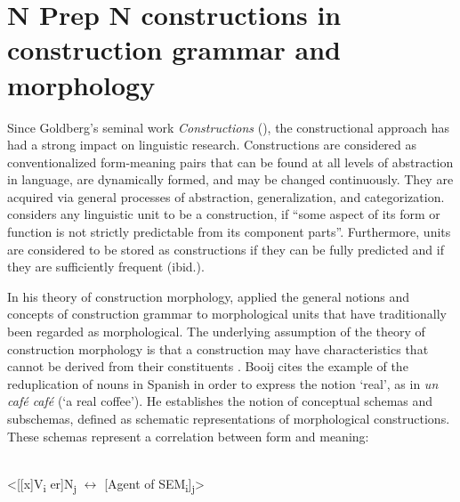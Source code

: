 \documentclass[output=paper]{langsci/langscibook}
\begin{document}
\section{N Prep N constructions in construction grammar and morphology}\label{sec:henneke:4}
Since Goldberg’s seminal work \textit{Constructions} (\citeyear{Goldberg:1995}), the constructional approach has had a strong impact on linguistic research. Constructions are considered as conventionalized form-meaning pairs that can be found at all levels of abstraction in language, are dynamically formed, and may be changed continuously. They are acquired via general processes of abstraction, generalization, and categorization. \citet[5]{Goldberg:2006} considers any linguistic unit to be a construction, if ``some aspect of its form or function is not strictly predictable from its component parts''. Furthermore, units are considered to be stored as constructions if they can be fully predicted and if they are sufficiently frequent (ibid.).

In his theory of construction morphology, \citet{Booij:2015} applied the general notions and concepts of construction grammar to morphological units that have traditionally been regarded as morphological. The underlying assumption of the theory of construction morphology is that a construction may have characteristics that cannot be derived from their constituents \citep[3]{Booij:2015}. Booij cites the example of the reduplication of nouns in Spanish in order to express the notion `real', as in \textit{un café café} (`a real coffee'). He establishes the notion of conceptual schemas and subschemas, defined as schematic representations of morphological constructions. These schemas represent a correlation between form and meaning:

\ea\citep[2]{Booij:2015}\\ <[[x]V\textsubscript{i} er]N\textsubscript{j} $\leftrightarrow$ [Agent of SEM\textsubscript{i}]\textsubscript{j}>\z
\end{document}
